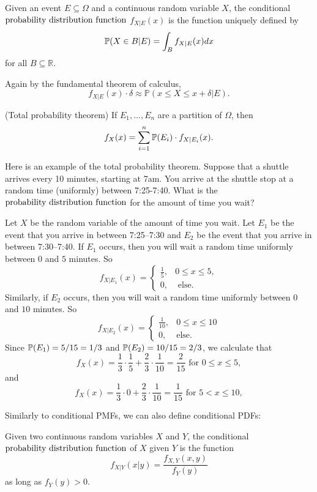 \documentclass{ximera}
\begin{document}
\begin{definition}
Given an event $E\subseteq \Omega$ and a continuous random variable $X$, the conditional $\text{probability distribution function}$ $f_{X\vert E}(x)$ is the function uniquely defined by 
$$
\mathbb{P}(X \in B \vert E) = \int_B f_{X \vert E}(x)dx
$$
for all $B\subseteq \mathbb{R}$.
\end{definition}
Again by the fundamental theorem of calculus,
$$
f_{X\vert E}(x) \cdot \delta \approx \mathbb{P}(x \leq X \leq x + \delta \vert E).
$$
\begin{theorem} (Total probability theorem)
If $E_1,\ldots,E_n$ are a partition of $\Omega$, then
$$
f_X(x) = \sum_{i=1}^n \mathbb{P}(E_i) \cdot f_{X \vert E_i}(x).
$$
\end{theorem}

Here is an example of the total probability theorem. Suppose that a shuttle arrives every 10 minutes, starting at 7am. You arrive at the shuttle stop at a random time (uniformly) between 7:25-7:40. What is the $\text{probability distribution function}$ for the amount of time you wait?

Let $X$ be the random variable of the amount of time you wait. Let $E_1$ be the event that you arrive in between 7:25--7:30 and $E_2$ be the event that you arrive in between 7:30--7:40. If $E_1$ occurs, then you will wait a random time uniformly between $0$ and $5$ minutes. So
$$
f_{X \vert E_1}(x) 
= 
\begin{cases}
\frac{1}{5}, & 0 \leq x \leq 5,\\
0, & \text{ else}.
\end{cases}
$$
Similarly, if $E_2$ occurs, then you will wait a random time uniformly between $0$ and $10$ minutes. So
$$
f_{X \vert E_2}(x)
= 
\begin{cases}
\frac{1}{10}, & 0 \leq x \leq 10\\
0, & \text{else}.
\end{cases}
$$
Since $\mathbb{P}(E_1)=5/15=1/3$ and $\mathbb{P}(E_2) = 10/15=2/3$, we calculate that
$$
f_X(x) = \frac{1}{3} \cdot \frac{1}{5} + \frac{2}{3} \cdot \frac{1}{10} = \frac{2}{15} \text{ for } 0 \leq x \leq 5,
$$
and
$$
f_X(x) = \frac{1}{3} \cdot 0 + \frac{2}{3} \cdot \frac{1}{10} = \frac{1}{15} \text{ for } 5 < x \leq 10,
$$

Similarly to conditional PMFs, we can also define conditional PDFs:
\begin{definition}
Given two continuous random variables $X$ and $Y$, the conditional $\text{probability distribution function}$ of $X$ given $Y$ is the function
$$
f_{X \vert Y}(x \vert y) = \frac{f_{X,Y}(x,y)}{f_Y(y)}
$$
as long as $f_Y(y)>0$.
\end{definition}
\end{document}
